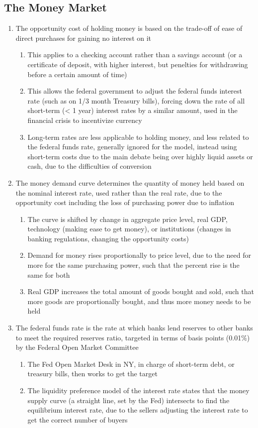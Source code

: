 \documentclass[11 pt, twoside]{article}
\begin{document}
\subsection{The Money Market}
\begin{enumerate}
\item The opportunity cost of holding money is based on the trade-off of ease of direct purchases for gaining no interest on it
\begin{enumerate}
\item This applies to a checking account rather than a savings account (or a certificate of deposit, with higher interest, but penelties for withdrawing before a certain amount of time)
\item This allows the federal government to adjust the federal funds interest rate (such as on 1/3 month Treasury bills), forcing down the rate of all short-term (< 1 year) interest rates by a similar amount, used in the financial crisis to incentivize currency
\item Long-term rates are less applicable to holding money, and less related to the federal funds rate, generally ignored for the model, instead using short-term costs due to the main debate being over highly liquid assets or cash, due to the difficulties of conversion
\end{enumerate}
\item The money demand curve determines the quantity of money held based on the nominal interest rate, used rather than the real rate, due to the opportunity cost including the loss of purchasing power due to inflation
\begin{enumerate}
\item The curve is shifted by change in aggregate price level, real GDP, technology (making ease to get money), or institutions (changes in banking regulations, changing the opportunity costs)
\item Demand for money rises proportionally to price level, due to the need for more for the same purchasing power, such that the percent rise is the same for both
\item Real GDP increases the total amount of goods bought and sold, such that more goods are proportionally bought, and thus more money needs to be held
\end{enumerate}
\item The federal funds rate is the rate at which banks lend reserves to other banks to meet the required reserves ratio, targeted in terms of basis points (0.01\%) by the Federal Open Market Committee
\begin{enumerate}
\item The Fed Open Market Desk in NY, in charge of short-term debt, or treasury bills, then works to get the target
\item The liquidity preference model of the interest rate states that the money supply curve (a straight line, set by the Fed) intersects to find the equilibrium interest rate, due to the sellers adjusting the interest rate to get the correct number of buyers
\end{enumerate}
\end{enumerate}
\end{document}
